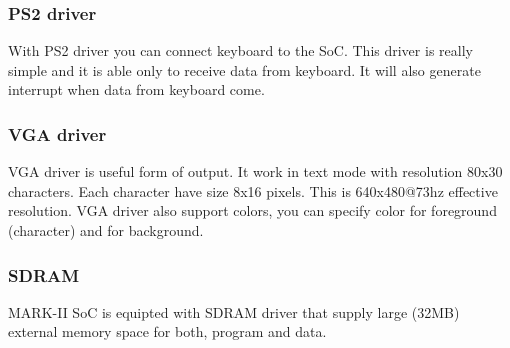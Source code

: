 \subsubsection{PS2 driver}

With PS2 driver you can connect keyboard to the SoC. This driver is really
simple and it is able only to receive data from keyboard. It will also generate
interrupt when data from keyboard come.

\subsubsection{VGA driver}

VGA driver is useful form of output. It work in text mode with resolution 80x30
characters. Each character have size 8x16 pixels. This is 640x480@73hz effective
resolution. VGA driver also support colors, you can specify color for foreground
(character) and for background.

\subsubsection{SDRAM}

MARK-II SoC is equipted with SDRAM driver that supply large (32MB) 
external memory space for both, program and data.
